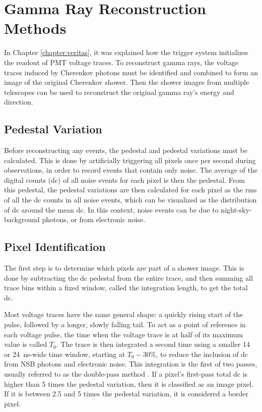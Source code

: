 \cleartooddpage[\thispagestyle{empty}]
\chapter{Gamma Ray Reconstruction Methods}\label{ch:grrecon}

In Chapter \ref{chapter:veritas}, it was explained how the trigger system initializes the readout of PMT voltage traces.
To reconstruct gamma rays, the voltage traces induced by Cherenkov photons must be identified and combined to form an image of the original Cherenkov shower.
Then the shower images from multiple telescopes can be used to reconstruct the original gamma ray's energy and direction.

\section{Pedestal Variation}
  Before reconstructing any events, the pedestal and pedestal variations must be calculated.
  This is done by artificially triggering all pixels once per second during observations, in order to record events that contain only noise.
  The average of the digital counts (dc) of all noise events for each pixel is then the pedestal.
  From this pedestal, the pedestal variations are then calculated for each pixel as the rms of all the dc counts in all noise events, which can be visualized as the distribution of dc around the mean dc.
  In this context, noise events can be due to night-sky-background photons, or from electronic noise.

\section{Pixel Identification}
  The first step is to determine which pixels are part of a shower image.
  This is done by subtracting the dc pedestal from the entire trace, and then summing all trace bins within a fixed window, called the integration length, to get the total dc.

  Most voltage traces have the same general shape: a quickly rising start of the pulse, followed by a longer, slowly falling tail.
  To act as a point of reference in each voltage pulse, the time when the voltage trace is at half of its maximum value is called $T_{0}$.
  The trace is then integrated a second time using a smaller 14 or \SI{24}{ns}-wide time window, starting at $T_0 - 30\%$, to reduce the inclusion of dc from NSB photons and electronic noise.
  This integration is the first of two passes, usually referred to as the double-pass method \cite{doublepass}.
  If a pixel's first-pass total dc is higher than 5 times the pedestal variation, then it is classified as an image pixel.
  If it is between 2.5 and 5 times the pedestal variation, it is considered a border pixel.

